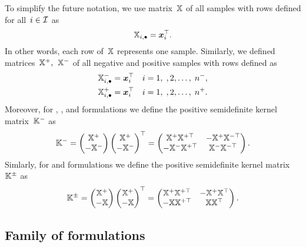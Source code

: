 \pagebreak

\begin{notation}\label{not: kernel matrix}
  To simplify the future notation, we use matrix~$\mathbb{X}$ of all samples with rows defined for all~$i \in \mathcal{I}$ as 
  \begin{equation*}
    \mathbb{X}_{i, \bullet} = \bm{x}_i^{\top}.
  \end{equation*}
  In other words, each row of~$\mathbb{X}$ represents one sample. Similarly, we defined matrices~$\mathbb{X}^+,$~$\mathbb{X}^-$ of all negative and positive samples with rows defined as
  \begin{align*}
    \mathbb{X}^{-}_{i, \bullet} & = \bm{x}_i^{\top} \quad i = 1, \;, 2, \ldots, \; n^-, \\
    \mathbb{X}^{+}_{i, \bullet} & = \bm{x}_i^{\top} \quad i = 1, \;, 2, \ldots, \; n^+.
  \end{align*}
  Moreover, for \TopPush, \TopPushK, \tauFPL and \PatMatNP formulations we define the positive semidefinite kernel matrix~$\mathbb{K}^{-}$ as
  \begin{equation*}
    \mathbb{K}^{-} = \begin{pmatrix} \mathbb{X}^+ \\ - \mathbb{X}^- \end{pmatrix} \begin{pmatrix} \mathbb{X}^+ \\ - \mathbb{X}^- \end{pmatrix}^\top = \begin{pmatrix} \mathbb{X}^+ \mathbb{X}^{+\top} & -\mathbb{X}^+ \mathbb{X}^{-\top} \\ -\mathbb{X}^- \mathbb{X}^{+\top} & \mathbb{X}^- \mathbb{X}^{-\top}  \end{pmatrix}.
  \end{equation*}
  Simlarly, for \TopMeanK and \PatMat formulations we define the positive semidefinite kernel matrix~$\mathbb{K}^{\pm}$ as
  \begin{equation*}
    \mathbb{K}^{\pm} = \begin{pmatrix} \mathbb{X}^+ \\ - \mathbb{X} \end{pmatrix} \begin{pmatrix} \mathbb{X}^+ \\ - \mathbb{X} \end{pmatrix}^\top = \begin{pmatrix} \mathbb{X}^+ \mathbb{X}^{+\top} & -\mathbb{X}^+ \mathbb{X}^{\top} \\ -\mathbb{X} \mathbb{X}^{+\top} & \mathbb{X} \mathbb{X}^{\top}  \end{pmatrix}.
  \end{equation*}
\end{notation}

\subsection{Family of \TopPushK formulations}

